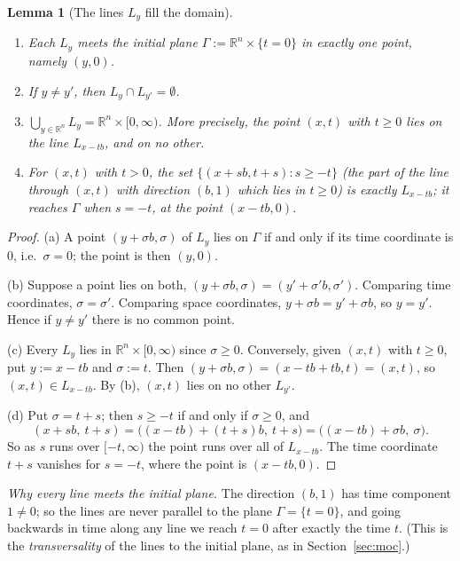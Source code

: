\documentclass[11pt]{article}
\theoremstyle{plain}
\newtheorem{lemma}[theorem]{Lemma}
\theoremstyle{definition}
\theoremstyle{remark}
\begin{document}
\begin{lemma}[The lines $L_y$ fill the domain]\label{lem:transgeom}
\begin{enumerate}
    \item[(a)] Each $L_y$ meets the initial plane $\Gamma := \mathbb{R}^n \times \{t = 0\}$ in exactly one point, namely $(y,0)$.
    \item[(b)] If $y \neq y'$, then $L_y \cap L_{y'} = \emptyset$.
    \item[(c)] $\displaystyle\bigcup_{y \in \mathbb{R}^n} L_y = \mathbb{R}^n \times [0,\infty)$. More precisely, the point $(x,t)$ with $t \geq 0$ lies on the line $L_{x - tb}$, and on no other.
    \item[(d)] For $(x,t)$ with $t > 0$, the set $\{(x + sb, t + s) : s \geq -t\}$ (the part of the line through $(x,t)$ with direction $(b,1)$ which lies in $t \geq 0$) is exactly $L_{x - tb}$; it reaches $\Gamma$ when $s = -t$, at the point $(x - tb,0)$.
\end{enumerate}
\end{lemma}
\begin{proof}
(a) A point $(y + \sigma b,\sigma)$ of $L_y$ lies on $\Gamma$ if and only if its time coordinate is $0$, i.e.\ $\sigma = 0$; the point is then $(y,0)$.

(b) Suppose a point lies on both, $(y + \sigma b, \sigma) = (y' + \sigma' b,\sigma')$. Comparing time coordinates, $\sigma = \sigma'$. Comparing space coordinates, $y + \sigma b = y' + \sigma b$, so $y = y'$. Hence if $y \ne y'$ there is no common point.

(c) Every $L_y$ lies in $\mathbb{R}^n \times [0,\infty)$ since $\sigma \geq 0$. Conversely, given $(x,t)$ with $t \geq 0$, put $y := x - tb$ and $\sigma := t$. Then $(y + \sigma b,\sigma) = (x - tb + tb, t) = (x,t)$, so $(x,t) \in L_{x - tb}$. By (b), $(x,t)$ lies on no other $L_{y'}$.

(d) Put $\sigma = t + s$; then $s \ge -t$ if and only if $\sigma \geq 0$, and
$$ (x + sb,\ t + s) = \big((x - tb) + (t + s)b,\ t + s\big) = \big((x - tb) + \sigma b,\ \sigma\big). $$
So as $s$ runs over $[-t,\infty)$ the point runs over all of $L_{x - tb}$. The time coordinate $t + s$ vanishes for $s = -t$, where the point is $(x - tb,0)$.
\end{proof}

\emph{Why every line meets the initial plane.} The direction $(b,1)$ has time component $1 \neq 0$; so the lines are never parallel to the plane $\Gamma = \{t = 0\}$, and going backwards in time along any line we reach $t = 0$ after exactly the time $t$. (This is the \emph{transversality} of the lines to the initial plane, as in Section~\ref{sec:moc}.)
\end{document}
